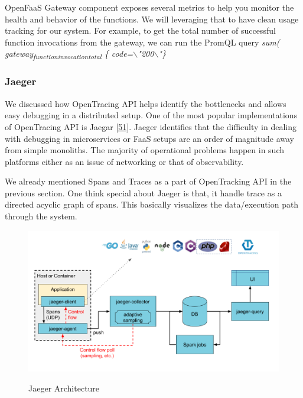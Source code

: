 \documentclass[12pt,titlepage]{article}
\begin{document}
OpenFaaS Gateway component exposes several metrics to help you monitor the
health and behavior of the functions. We will leveraging that to have clean
usage tracking for our system. For example, to get the total number of
successful function invocations from the gateway, we can run the PromQL query
\emph{sum( gateway\textsubscript{function}\textsubscript{invocation}\textsubscript{total} \{  code=$\backslash$"200$\backslash$"\}}



\subsubsection{Jaeger}
\label{sec:org3ceefc6}
We discussed how OpenTracing API helps identify the bottlenecks and allows easy
debugging in a distributed setup. One of the most popular implementations of
OpenTracing API is Jaegar \hyperref[ref:51]{[51}]. Jaeger identifies that the difficulty in
dealing with debugging in microservices or FaaS setups are an order of magnitude
away from simple monoliths. The majority of operational problems happen in such platforms
either as an issue of networking or that of observability.

We already mentioned Spans and Traces as a part of OpenTracking API in the
previous section. One think special about Jaeger is that, it handle trace as a
directed acyclic graph of spans. This basically visualizes the data/execution
path through the system.

\begin{figure}[!h]
    \caption{Jaeger Architecture}
    \centering
    \includegraphics[width=130mm]{./thesis_images/jaeger.png}
    \label{fig:jaeger}
\end{figure}
\end{document}
